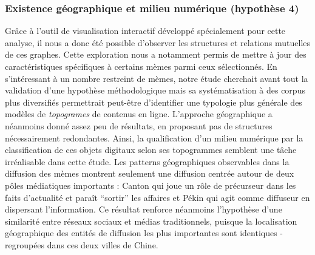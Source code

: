 \subsubsection{Existence g\'eographique et milieu num\'erique (hypoth\`ese 4)}
 
Gr\^ace \`a l{\textquoteright}outil de visualisation interactif d\'evelopp\'e sp\'ecialement pour cette analyse, il nous a donc \'et\'e possible d{\textquoteright}observer les structures et relations mutuelles de ces graphes. Cette exploration nous a notamment permis de mettre \`a jour des caract\'eristiques sp\'ecifiques \`a certains m\`emes parmi ceux s\'electionn\'es. En s{\textquoteright}int\'eressant \`a un nombre restreint de m\`emes, notre \'etude cherchait avant tout la validation d{\textquoteright}une hypoth\`ese m\'ethodologique mais sa syst\'ematisation \`a des corpus plus diversifi\'es permettrait peut-\^etre d{\textquoteright}identifier une typologie plus g\'en\'erale des mod\`eles de \textit{topogrames} de contenus en ligne. L{\textquoteright}approche g\'eographique a n\'eanmoins donn\'e assez peu de r\'esultats, en proposant pas de structures n\'ecessairement redondantes. Ainsi, la qualification d{\textquoteright}un milieu num\'erique par la classification de ces objets digitaux selon ses topogrammes semblent une t\^ache irr\'ealisable dans cette \'etude. Les patterns g\'eographiques observables dans la diffusion des m\`emes montrent seulement une diffusion centr\'ee autour de deux p\^oles m\'ediatiques importants : Canton qui joue un r\^ole de pr\'ecurseur dans les faits d{\textquoteright}actualit\'e et para\^it {\textquotedblleft}sortir{\textquotedblright} les affaires et P\'ekin qui agit comme diffuseur en dispersant l{\textquoteright}information. Ce r\'esultat renforce n\'eanmoins l{\textquoteright}hypoth\`ese d{\textquoteright}une similarit\'e entre r\'eseaux sociaux et m\'edias traditionnels, puisque la localisation g\'eographique des entit\'es de diffusion les plus importantes sont identiques - regroup\'ees dans ces deux villes de Chine.


